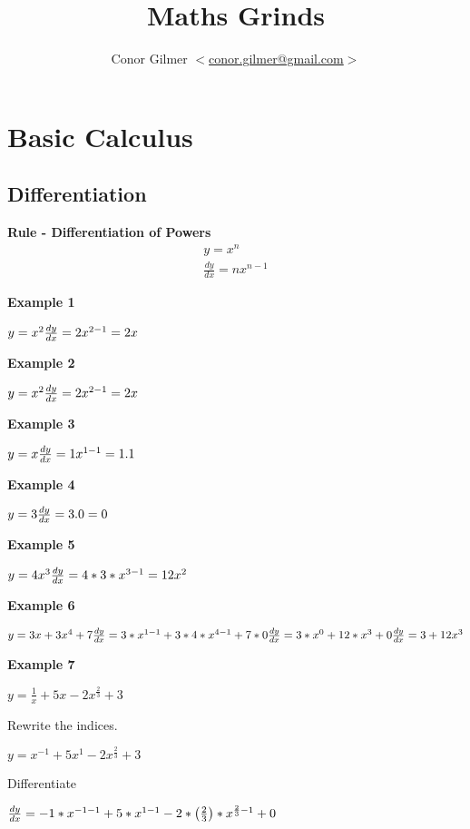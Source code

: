 \documentclass{article}
\title{\gmat{} Maths Grinds}
\author{Conor Gilmer $<$\href{mailto:conor.gilmer@gmail.com}{conor.gilmer@gmail.com}$>$}
\begin{document}
\section{Basic Calculus}
\subsection{Differentiation}
\textbf{Rule - Differentiation of Powers}
\begin{equation}
\begin{split}
y = x^{n} \\
\frac{dy}{dx} = nx^{n-1}
\end{split}
\end{equation}




\textbf{Example 1}

$y = x^{2}\\
\frac{dy}{dx} = 2x^{2-1} = 2x
$


\textbf{Example 2}

$y = x^{2}\\
\frac{dy}{dx} = 2x^{2-1} = 2x
$


\textbf{Example 3}

$y = x\\
\frac{dy}{dx} = 1x^{1-1} = 1.1
$

\textbf{Example 4}

$y = 3\\
\frac{dy}{dx} = 3.0 = 0
$

\textbf{Example 5}

$y = 4x^{3}\\
\frac{dy}{dx} = 4*3*x^{3-1} = 12x^{2}
$


\textbf{Example 6}

$y = 3x + 3x^{4} + 7\\
\frac{dy}{dx} = 3*x^{1-1} + 3*4*x^{4-1} + 7 * 0 \\
\frac{dy}{dx} = 3*x^{0} + 12*x^{3} + 0\\
\frac{dy}{dx} = 3 + 12x^{3} \\
$

\textbf{Example 7}

$y = \frac{1}{x} + 5x - 2x^{\frac{2}{3}} + 3$

Rewrite the indices.

$y = x^{-1} +  5x^{1} - 2x^{\frac{2}{3}} + 3$

Differentiate

$\frac{dy}{dx} = -1*x^{-1-1} +5*x^{1-1} - 2 * \left(\frac{2}{3}\right) * x^{\frac{2}{3} - 1}   + 0 \\
$
\end{document}
